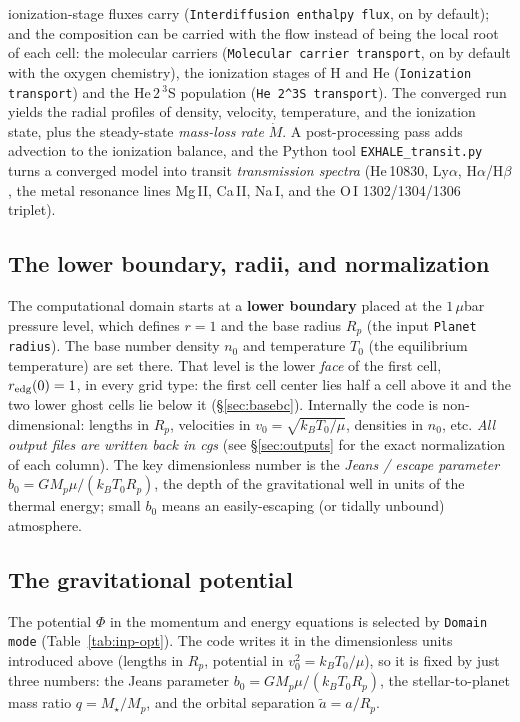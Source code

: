 \documentclass[english,a4paper]{my_memo}
\begin{document}
ionization-stage fluxes carry (\texttt{Interdiffusion enthalpy flux}, on by
default); and the composition can be carried with the flow instead of being
the local root of each cell: the molecular carriers
(\texttt{Molecular carrier transport}, on by default with the oxygen
chemistry), the ionization stages of H and He
(\texttt{Ionization transport}) and the He\,$2\,^3$S population
(\texttt{He 2\^{}3S transport}). The converged run yields the radial
profiles of density, velocity,
temperature, and the ionization state, plus the steady-state \emph{mass-loss
rate} $\dot M$. A post-processing pass adds advection to the ionization balance,
and the Python tool \texttt{EXHALE\_transit.py} turns a converged model into transit
\emph{transmission spectra} (He\,10830, Ly$\alpha$, H$\alpha$/H$\beta$, the
metal resonance lines Mg\,II, Ca\,II, Na\,I, and the O\,I 1302/1304/1306 triplet).

\subsection{The lower boundary, radii, and normalization}
The computational domain starts at a \textbf{lower boundary} placed at the
$1\,\mu$bar pressure level, which defines $r=1$ and the base radius $R_p$ (the
input \texttt{Planet radius}). The base number density $n_0$ and temperature
$T_0$ (the equilibrium temperature) are set there. That level is the lower
\emph{face} of the first cell, $r_{\rm edg}(0)=1$, in every grid type: the
first cell center lies half a cell above it and the two lower ghost cells lie
below it (\S\ref{sec:basebc}). Internally the code is
non-dimensional: lengths in $R_p$, velocities in $v_0=\sqrt{k_BT_0/\mu}$,
densities in $n_0$, etc. \emph{All output files are written back in cgs} (see
\S\ref{sec:outputs} for the exact normalization of each column). The key
dimensionless number is the \emph{Jeans / escape parameter}
$b_0 = GM_p\mu/(k_BT_0R_p)$, the depth of the gravitational well in units of the
thermal energy; small $b_0$ means an easily-escaping (or tidally unbound)
atmosphere.

\subsection{The gravitational potential}\label{sec:potential}
The potential $\Phi$ in the momentum and energy equations is selected by
\texttt{Domain mode} (Table~\ref{tab:inp-opt}). The code writes it in the
dimensionless units introduced above (lengths in $R_p$, potential in
$v_0^2=k_BT_0/\mu$), so it is fixed by just three numbers: the Jeans parameter
$b_0=GM_p\mu/(k_BT_0R_p)$, the stellar-to-planet mass ratio $q=M_\star/M_p$, and
the orbital separation $\tilde a=a/R_p$.
\end{document}
